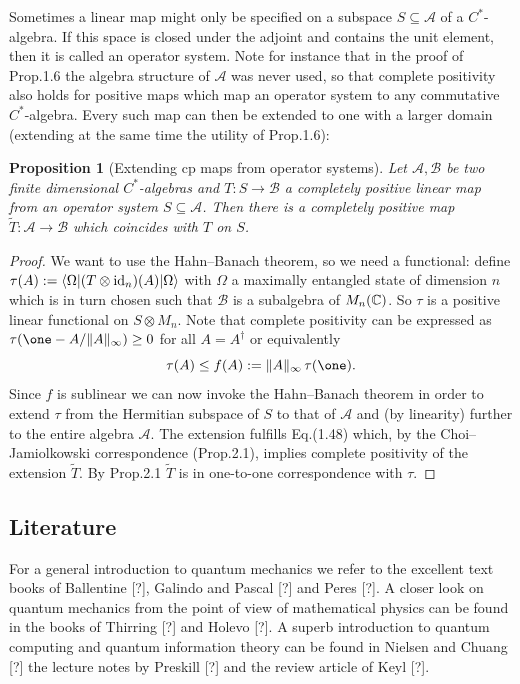 \documentclass[11pt,a4paper]{article}
\theoremstyle{plain}
\newtheorem{proposition}{Proposition}[section]
\theoremstyle{definition}
\theoremstyle{remark}
\numberwithin{equation}{section}
\begin{document}
Sometimes a linear map might only be specified on a subspace $S\subseteq \mathcal{A}$ of a $C^\ast$-algebra. If this space is closed under the adjoint and contains the unit element, then it is called an operator system. Note for instance that in the proof of Prop.1.6 the algebra structure of $\mathcal{A}$ was never used, so that complete positivity also holds for positive maps which map an operator system to any commutative $C^\ast$-algebra. Every such map can then be extended to one with a larger domain (extending at the same time the utility of Prop.1.6):

\begin{proposition}[Extending cp maps from operator systems]
    Let $\mathcal{A},\mathcal{B}$ be two finite dimensional $C^\ast$-algebras and $T:S\to \mathcal{B}$ a completely positive linear map from an operator system $S\subseteq \mathcal{A}$. Then there is a completely positive map $\tilde{T}:\mathcal{A}\to \mathcal{B}$ which coincides with $T$ on $S$.
\end{proposition}

\begin{proof}
    We want to use the Hahn--Banach theorem, so we need a functional: define $\tau(A):=\langle\Omega|(T\otimes \mathrm{id}_n)(A)|\Omega\rangle$ with $\Omega$ a maximally entangled state of dimension $n$ which is in turn chosen such that $\mathcal{B}$ is a subalgebra of $M_n(\mathbb{C})$. So $\tau$ is a positive linear functional on $S\otimes M_n$. Note that complete positivity can be expressed as $\tau(\one-A/\|A\|_\infty)\ge 0$ for all $A=A^\dagger$ or equivalently
    \begin{equation}
        \tau(A)\le f(A):=\|A\|_\infty\,\tau(\one).
    \end{equation}
    Since $f$ is sublinear we can now invoke the Hahn--Banach theorem in order to extend $\tau$ from the Hermitian subspace of $S$ to that of $\mathcal{A}$ and (by linearity) further to the entire algebra $\mathcal{A}$. The extension fulfills Eq.(1.48) which, by the Choi--Jamiolkowski correspondence (Prop.2.1), implies complete positivity of the extension $\tilde{T}$. By Prop.2.1 $\tilde{T}$ is in one-to-one correspondence with $\tau$.
\end{proof}

\subsection{Literature}

For a general introduction to quantum mechanics we refer to the excellent text books of Ballentine [?], Galindo and Pascal [?] and Peres [?]. A closer look on quantum mechanics from the point of view of mathematical physics can be found in the books of Thirring [?] and Holevo [?]. A superb introduction to quantum computing and quantum information theory can be found in Nielsen and Chuang [?] the lecture notes by Preskill [?] and the review article of Keyl [?].
\end{document}
